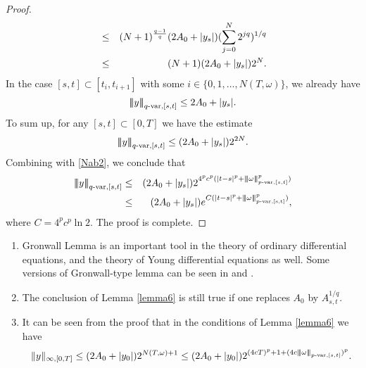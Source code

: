 \documentclass[10pt]{article}
\numberwithin{equation}{section} %
\newcommand{\ltn}{\ensuremath{\left| \! \left| \! \left|}}
\newcommand{\rtn}{\ensuremath{\right| \! \right| \! \right|}}
\begin{document}
\begin{proof}
\begin{eqnarray}
&\leq & (N+1)^{\frac{q-1}{q}}(2A_0+|y_s|)(\sum_{j=0}^{N} 2^{jq})^{1/q} \notag\\
&\leq &(N+1)(2A_0+|y_s|)2^{N}. \notag
\end{eqnarray} 
In the case $[s,t]\subset [t_i,t_{i+1}]$ with some $i\in \{0, 1,\dots , N(T,\omega)\}$, we already have 
$$
\ltn y\rtn_{q\text{-var},[s,t]}\leq 2A_0 + |y_s|.
$$
To sum up, for any $[s,t]\subset[0,T]$ we have the estimate 
$$
\ltn y\rtn_{q\text{-var},[s,t]}\leq (2A_0+|y_s|)2^{2N}.
$$
Combining with \eqref{Nab2}, we conclude that%
\begin{eqnarray*}  
\ltn y\rtn_{q\text{-var},[s,t]} &\leq& (2A_0+|y_s|)2^{4^pc^p(|t-s|^p+\ltn\omega\rtn^p_{p\text{-var},[s,t]})}\\
&\leq & (2A_0+|y_s|) e^{C(|t-s|^p+ \ltn\omega\rtn_{p\text{-}\rm{var},[s,t]}^{p})},
\end{eqnarray*}
where $C=  4^pc^p\ln 2$.
The proof is complete.
\end{proof}
\begin{remark}
\begin{enumerate}
\item Gronwall Lemma is an important tool in the theory of ordinary differential equations, and the theory of Young differential equations as well. Some versions of Gronwall-type lemma can be seen in \cite{nualart3} and \cite{Martina}.
\item The conclusion of Lemma \ref{lemma6} is still true if one replaces $A_0$ by $A^{1/q}_{s,t}$.
\item It can be seen from the proof that in the conditions of Lemma \ref{lemma6} we have
$$\|y\|_{\infty,[0,T]}\leq (2A_0+|y_0|)2^{N(T,\omega)+1}\leq (2A_0+|y_0|)2^{(4cT)^p+1+ (4c\ltn\omega\rtn_{p\text{-var},[s,t]})^p}.$$
\end{enumerate}
\end{remark}
\end{document}
